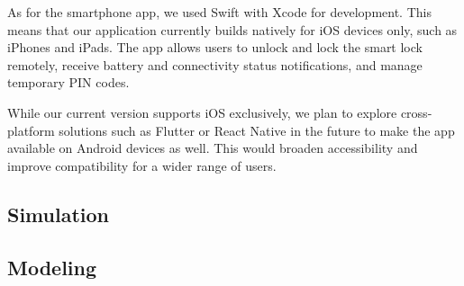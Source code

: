 As for the smartphone app, we used Swift with Xcode for development. This means that our application currently builds natively for iOS devices only, such as iPhones and iPads. The app allows users to unlock and lock the smart lock remotely, receive battery and connectivity status notifications, and manage temporary PIN codes.

While our current version supports iOS exclusively, we plan to explore cross-platform solutions such as Flutter or React Native in the future to make the app available on Android devices as well. This would broaden accessibility and improve compatibility for a wider range of users.

\subsection{Simulation}

\subsection{Modeling}

